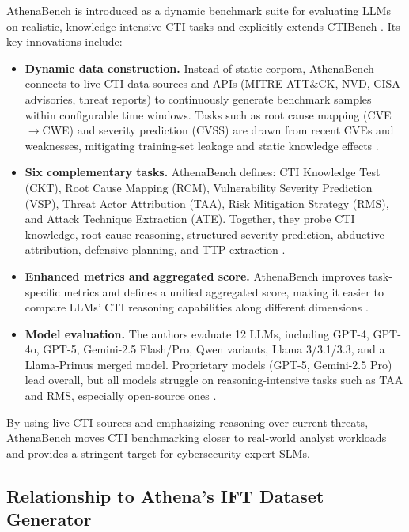 \documentclass[unnumsec,webpdf,contemporary,large]{oup-authoring-template}
\theoremstyle{thmstyleone}
\theoremstyle{thmstyletwo}
\theoremstyle{thmstylethree}
\begin{document}
AthenaBench is introduced as a dynamic benchmark suite for evaluating LLMs on realistic, knowledge-intensive CTI tasks and explicitly extends CTIBench \cite{alam2025athenabench,alam2024ctibench}. Its key innovations include:

\begin{itemize}
  \item \textbf{Dynamic data construction.} Instead of static corpora, AthenaBench connects to live CTI data sources and APIs (MITRE ATT\&CK, NVD, CISA advisories, threat reports) to continuously generate benchmark samples within configurable time windows. Tasks such as root cause mapping (CVE$\rightarrow$CWE) and severity prediction (CVSS) are drawn from recent CVEs and weaknesses, mitigating training-set leakage and static knowledge effects \cite{alam2025athenabench}.
  \item \textbf{Six complementary tasks.} AthenaBench defines: CTI Knowledge Test (CKT), Root Cause Mapping (RCM), Vulnerability Severity Prediction (VSP), Threat Actor Attribution (TAA), Risk Mitigation Strategy (RMS), and Attack Technique Extraction (ATE). Together, they probe CTI knowledge, root cause reasoning, structured severity prediction, abductive attribution, defensive planning, and TTP extraction \cite{alam2025athenabench}.
  \item \textbf{Enhanced metrics and aggregated score.} AthenaBench improves task-specific metrics and defines a unified aggregated score, making it easier to compare LLMs' CTI reasoning capabilities along different dimensions \cite{alam2025athenabench}.
  \item \textbf{Model evaluation.} The authors evaluate 12 LLMs, including GPT-4, GPT-4o, GPT-5, Gemini-2.5 Flash/Pro, Qwen variants, Llama 3/3.1/3.3, and a Llama-Primus merged model. Proprietary models (GPT-5, Gemini-2.5 Pro) lead overall, but all models struggle on reasoning-intensive tasks such as TAA and RMS, especially open-source ones \cite{alam2025athenabench}.
\end{itemize}

By using live CTI sources and emphasizing reasoning over current threats, AthenaBench moves CTI benchmarking closer to real-world analyst workloads and provides a stringent target for cybersecurity-expert SLMs.

\subsection{Relationship to Athena's IFT Dataset Generator}
\end{document}
